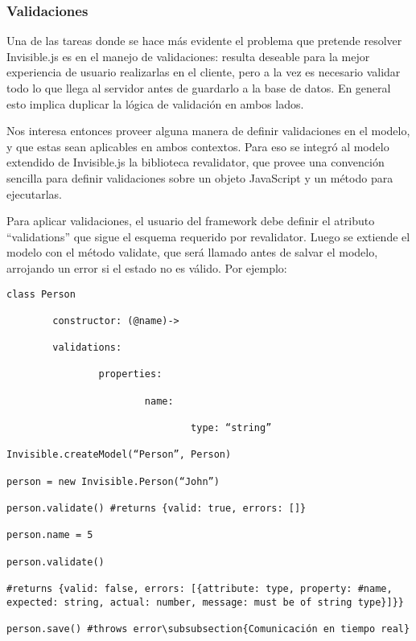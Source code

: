 \documentclass[doc,helv,longtable]{article}
\begin{document}
\subsubsection{Validaciones}
Una de las tareas donde se hace más evidente el problema que pretende resolver Invisible.js es en el manejo de validaciones: resulta deseable para la mejor experiencia de usuario realizarlas en el cliente, pero a la vez es necesario validar todo lo que llega al servidor antes de guardarlo a la base de datos. En general esto implica duplicar la lógica de validación en ambos lados.

Nos interesa entonces proveer alguna manera de definir validaciones en el modelo, y que estas sean aplicables en ambos contextos. Para eso se integró al modelo extendido de Invisible.js la biblioteca revalidator\cite{revalidator}, que provee una convención sencilla para definir validaciones sobre un objeto JavaScript y un método para ejecutarlas.

Para aplicar validaciones, el usuario del framework debe definir el atributo “validations” que sigue el esquema requerido por revalidator. Luego se extiende el modelo con el método validate, que será llamado antes de salvar el modelo, arrojando un error si el estado no es válido. Por ejemplo:

\begin{verbatim}
class Person

        constructor: (@name)->

        validations: 

                properties:

                        name:

                                type: “string”

Invisible.createModel(“Person”, Person)

person = new Invisible.Person(“John”)

person.validate() #returns {valid: true, errors: []}

person.name = 5

person.validate() 

#returns {valid: false, errors: [{attribute: type, property: #name, expected: string, actual: number, message: must be of string type}]}}

person.save() #throws error\subsubsection{Comunicación en tiempo real}
\end{verbatim}
\end{document}

